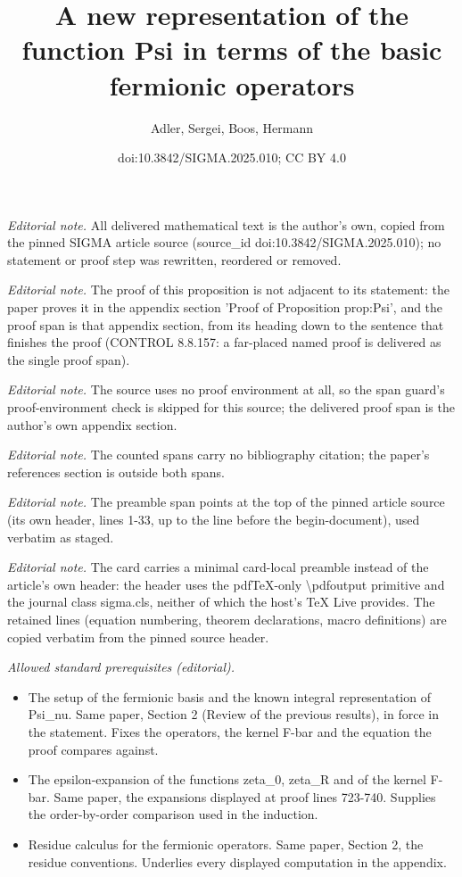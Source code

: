 \documentclass[10pt,a4paper]{amsart}
\title{A new representation of the function Psi in terms of the basic fermionic operators}
\author{Adler, Sergei, Boos, Hermann}
\date{doi:10.3842/SIGMA.2025.010; CC BY 4.0}
\numberwithin{equation}{section}
\begin{document}
\maketitle
\setcounter{section}{3}
\setcounter{subsection}{0}
\setcounter{Theorem}{0}
\setcounter{equation}{0}
\noindent\textit{Editorial note.} All delivered mathematical text is the author's own, copied from the pinned SIGMA article source (source\_id doi:10.3842/SIGMA.2025.010); no statement or proof step was rewritten, reordered or removed.\par\medskip
\noindent\textit{Editorial note.} The proof of this proposition is not adjacent to its statement: the paper proves it in the appendix section 'Proof of Proposition prop:Psi', and the proof span is that appendix section, from its heading down to the sentence that finishes the proof (CONTROL 8.8.157: a far-placed named proof is delivered as the single proof span).\par\medskip
\noindent\textit{Editorial note.} The source uses no proof environment at all, so the span guard's proof-environment check is skipped for this source; the delivered proof span is the author's own appendix section.\par\medskip
\noindent\textit{Editorial note.} The counted spans carry no bibliography citation; the paper's references section is outside both spans.\par\medskip
\noindent\textit{Editorial note.} The preamble span points at the top of the pinned article source (its own header, lines 1-33, up to the line before the begin-document), used verbatim as staged.\par\medskip
\noindent\textit{Editorial note.} The card carries a minimal card-local preamble instead of the article's own header: the header uses the pdfTeX-only \textbackslash{}pdfoutput primitive and the journal class sigma.cls, neither of which the host's TeX Live provides. The retained lines (equation numbering, theorem declarations, macro definitions) are copied verbatim from the pinned source header.\par\medskip
\noindent\textit{Allowed standard prerequisites (editorial).}\begin{itemize}
\item The setup of the fermionic basis and the known integral representation of Psi\_nu. Same paper, Section 2 (Review of the previous results), in force in the statement. Fixes the operators, the kernel F-bar and the equation the proof compares against.
\item The epsilon-expansion of the functions zeta\_0, zeta\_R and of the kernel F-bar. Same paper, the expansions displayed at proof lines 723-740. Supplies the order-by-order comparison used in the induction.
\item Residue calculus for the fermionic operators. Same paper, Section 2, the residue conventions. Underlies every displayed computation in the appendix.
\end{itemize}\medskip
\end{document}
